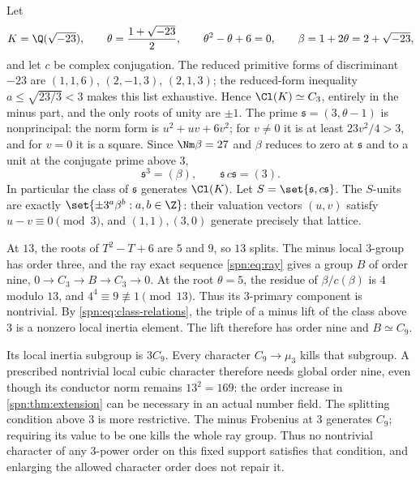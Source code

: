 Let
\[
 K=\Q(\sqrt{-23}),\qquad\theta=\frac{1+\sqrt{-23}}2,\qquad
 \theta^2-\theta+6=0,\qquad\beta=1+2\theta=2+\sqrt{-23},
\]
and let $c$ be complex conjugation. The reduced primitive forms of
discriminant $-23$ are $(1,1,6)$, $(2,-1,3)$, $(2,1,3)$; the reduced-form
inequality $a\le\sqrt{23/3}<3$ makes this list exhaustive. Hence
$\Cl(K)\simeq C_3$, entirely in the minus part, and the only roots of unity
are $\pm1$. The prime $\mathfrak s=(3,\theta-1)$ is nonprincipal: the norm
form is $u^2+uv+6v^2$; for $v\ne0$ it is at least $23v^2/4>3$, and for $v=0$
it is a square. Since $\Nm\beta=27$ and $\beta$ reduces to zero at
$\mathfrak s$ and to a unit at the conjugate prime above $3$,
\begin{equation}\label{spn:eq:class-relations}
 \mathfrak s^3=(\beta),\qquad\mathfrak s\,c\mathfrak s=(3).
\end{equation}
In particular the class of $\mathfrak s$ generates $\Cl(K)$. Let
$S=\set{\mathfrak s,c\mathfrak s}$. The $S$-units are exactly
$\set{\pm3^a\beta^b:a,b\in\Z}$: their valuation vectors $(u,v)$ satisfy
$u-v\equiv0\pmod3$, and $(1,1),(3,0)$ generate precisely that lattice.

\begin{example}\label{spn:ex:conductor13}
At $13$, the roots of $T^2-T+6$ are $5$ and $9$, so $13$ splits. The minus
local $3$-group has order three, and the ray exact sequence \eqref{spn:eq:ray}
gives a group $B$ of order nine,
$0\to C_3\to B\to C_3\to0$. At the root $\theta=5$, the residue of
$\beta/c(\beta)$ is $4$ modulo $13$, and $4^4\equiv9\not\equiv1\pmod{13}$.
Thus its $3$-primary component is nontrivial. By
\eqref{spn:eq:class-relations}, the triple of a minus lift of the class above
$3$ is a nonzero local inertia element. The lift therefore has order nine and
$B\simeq C_9$.

Its local inertia subgroup is $3C_9$. Every character $C_9\to\mu_3$ kills
that subgroup. A prescribed nontrivial local cubic character therefore needs
global order nine, even though its conductor norm remains $13^2=169$: the
order increase in \cref{spn:thm:extension} can be necessary in an actual
number field. The splitting condition above $3$ is more restrictive. The
minus Frobenius at $3$ generates $C_9$; requiring its value to be one kills
the whole ray group. Thus no nontrivial character of any $3$-power order on
this fixed support satisfies that condition, and enlarging the allowed
character order does not repair it.
\end{example}

